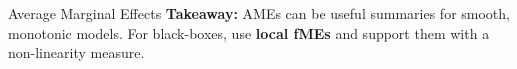 \documentclass[11pt,compress,t,notes=noshow, aspectratio=169, xcolor=table]{beamer}
\begin{document}
\begin{frame}{Average Marginal Effects}
\vspace{0.2em}
\textbf{Takeaway:} AMEs can be useful summaries for smooth, monotonic models.  
For black-boxes, use \textbf{local fMEs} and support them with a non-linearity measure.

\end{frame}




















\end{document}
